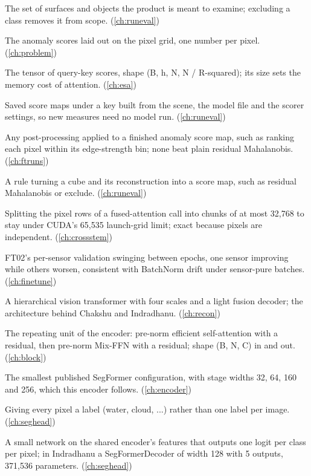 \begin{description}[style=nextline,leftmargin=1.2em,font=\normalfont\bfseries]
\item[Scope] The set of surfaces and objects the product is meant to examine; excluding a class removes it from scope. (\cref{ch:runeval})
\item[Score map] The anomaly scores laid out on the pixel grid, one number per pixel. (\cref{ch:problem})
\item[Score tensor] The tensor of query-key scores, shape (B, h, N, N / R-squared); its size sets the memory cost of attention. (\cref{ch:esa})
\item[Score-map cache] Saved score maps under a key built from the scene, the model file and the scorer settings, so new measures need no model run. (\cref{ch:runeval})
\item[Score-map correction] Any post-processing applied to a finished anomaly score map, such as ranking each pixel within its edge-strength bin; none beat plain residual Mahalanobis. (\cref{ch:ftruns})
\item[Scorer] A rule turning a cube and its reconstruction into a score map, such as residual Mahalanobis or exclude. (\cref{ch:runeval})
\item[SDPA row chunking] Splitting the pixel rows of a fused-attention call into chunks of at most 32,768 to stay under CUDA's 65,535 launch-grid limit; exact because pixels are independent. (\cref{ch:crossstem})
\item[See-saw] FT02's per-sensor validation swinging between epochs, one sensor improving while others worsen, consistent with BatchNorm drift under sensor-pure batches. (\cref{ch:finetune})
\item[SegFormer] A hierarchical vision transformer with four scales and a light fusion decoder; the architecture behind Chakshu and Indradhanu. (\cref{ch:recon})
\item[SegFormer block] The repeating unit of the encoder: pre-norm efficient self-attention with a residual, then pre-norm Mix-FFN with a residual; shape (B, N, C) in and out. (\cref{ch:block})
\item[SegFormer-B0] The smallest published SegFormer configuration, with stage widths 32, 64, 160 and 256, which this encoder follows. (\cref{ch:encoder})
\item[Segmentation] Giving every pixel a label (water, cloud, ...) rather than one label per image. (\cref{ch:seghead})
\item[Segmentation head] A small network on the shared encoder's features that outputs one logit per class per pixel; in Indradhanu a SegFormerDecoder of width 128 with 5 outputs, 371,536 parameters. (\cref{ch:seghead})

\end{description}
